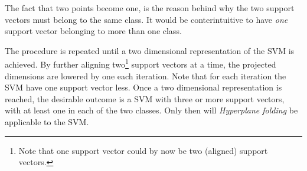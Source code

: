 \documentclass[a4paper,twoside]{bth}
\begin{document}
\par The fact that two points become one, is the reason behind why the two support vectors must belong to the same class. It would be conterintuitive to have \textit{one} support vector belonging to more than one class. %

\par The procedure is repeated until a two dimensional representation of the SVM is achieved. By further aligning two\footnote{Note that one support vector could by now be two (aligned) support vectors.} support vectors at a time, the projected dimensions are lowered by one each iteration. Note that for each iteration the SVM have one support vector less. Once a two dimensional representation is reached, the desirable outcome is a SVM with three or more support vectors, with at least one in each of the two classes. Only then will \textit{Hyperplane folding} be applicable to the SVM.



\end{document}
